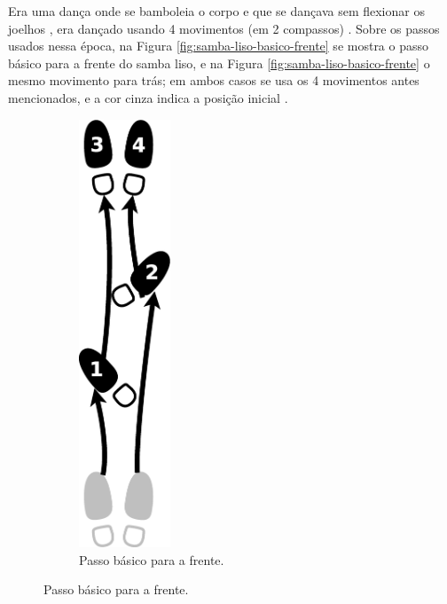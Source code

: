Era uma dança onde se bamboleia o corpo e que se dançava sem flexionar os joelhos \cite[pp. 58]{freitas1959danca} \cite[pp. 143]{perna2002samba},
era dançado usando 4 movimentos (em 2 compassos) \cite[pp. 62]{freitas1959danca} \cite[pp. 143]{perna2002samba}.
Sobre os passos usados nessa época, 
na Figura \ref{fig:samba-liso-basico-frente} se mostra o passo básico para a frente do samba liso,
e na  Figura \ref{fig:samba-liso-basico-frente} o mesmo movimento para trás; 
em ambos casos se usa os 4 movimentos antes mencionados, e a cor cinza indica a posição inicial \cite[pp. 63]{freitas1959danca}. 
\begin{figure}[h]
    \centering
    \begin{subfigure}[b]{0.3\textwidth}
        \centering
        \includegraphics[width=0.3\textwidth]{chapters/cap-historia-dancasamba/samba-liso-basico-frente.eps}
        \caption{Passo básico para a frente.}

\end{subfigure}
\end{figure}

